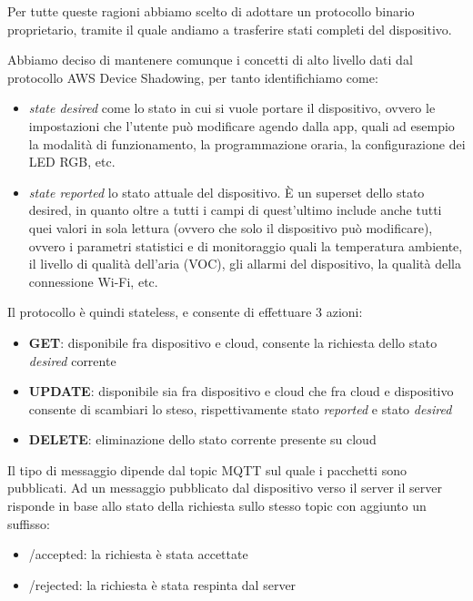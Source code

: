 \documentclass{article}
\begin{document}
Per tutte queste ragioni abbiamo scelto di adottare un protocollo binario proprietario, 
tramite il quale andiamo a trasferire stati completi del dispositivo. 

Abbiamo deciso di mantenere comunque i concetti di alto livello dati dal protocollo AWS 
Device Shadowing, per tanto identifichiamo come:
\begin{itemize}
    \item \textit{state desired} come lo stato in cui si vuole portare il dispositivo, ovvero le 
        impostazioni che l'utente può modificare agendo dalla app, quali ad esempio la modalità di funzionamento,
        la programmazione oraria, la configurazione dei LED RGB, etc.
    \item \textit{state reported} lo stato attuale del dispositivo. È un superset dello stato 
        desired, in quanto oltre a tutti i campi di quest'ultimo include anche tutti quei valori
        in sola lettura (ovvero che solo il dispositivo può modificare), ovvero i parametri 
        statistici e di monitoraggio quali la temperatura ambiente, il livello di qualità dell'aria (VOC),
        gli allarmi del dispositivo, la qualità della connessione Wi-Fi, etc.
\end{itemize}

Il protocollo è quindi stateless, e consente di effettuare 3 azioni:

\begin{itemize}
    \item \textbf{GET}: disponibile fra dispositivo e cloud, consente la richiesta dello stato \textit{desired} corrente
    \item \textbf{UPDATE}: disponibile sia fra dispositivo e cloud che fra cloud e dispositivo consente di scambiari lo steso, 
        rispettivamente stato \textit{reported} e stato \textit{desired}
    \item \textbf{DELETE}: eliminazione dello stato corrente presente su cloud
\end{itemize}

Il tipo di messaggio dipende dal topic MQTT sul quale i pacchetti sono pubblicati. Ad 
un messaggio pubblicato dal dispositivo verso il server il server risponde in base allo 
stato della richiesta sullo stesso topic con aggiunto un suffisso:
\begin{itemize}
    \item /accepted: la richiesta è stata accettate
    \item /rejected: la richiesta è stata respinta dal server 
\end{itemize}
\end{document}
